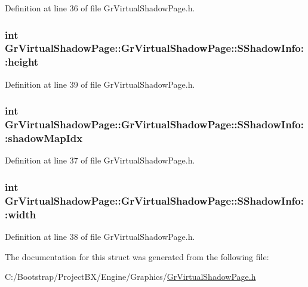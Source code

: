 Definition at line 36 of file GrVirtualShadowPage.h.\hypertarget{struct_gr_virtual_shadow_page_1_1_s_shadow_info_9558ecd2760590cd97d3133ae338f59d}{
\subsubsection[{height}]{\setlength{\rightskip}{0pt plus 5cm}int {\bf GrVirtualShadowPage::GrVirtualShadowPage::SShadowInfo::height}}}
\label{struct_gr_virtual_shadow_page_1_1_s_shadow_info_9558ecd2760590cd97d3133ae338f59d}




Definition at line 39 of file GrVirtualShadowPage.h.\hypertarget{struct_gr_virtual_shadow_page_1_1_s_shadow_info_7f7e9d5b244e39ccc703ccd4d93c9529}{
\subsubsection[{shadowMapIdx}]{\setlength{\rightskip}{0pt plus 5cm}int GrVirtualShadowPage::GrVirtualShadowPage::SShadowInfo::shadowMapIdx}}
\label{struct_gr_virtual_shadow_page_1_1_s_shadow_info_7f7e9d5b244e39ccc703ccd4d93c9529}




Definition at line 37 of file GrVirtualShadowPage.h.\hypertarget{struct_gr_virtual_shadow_page_1_1_s_shadow_info_8c1baf33631ec0aa71acb781cfbe2459}{
\subsubsection[{width}]{\setlength{\rightskip}{0pt plus 5cm}int {\bf GrVirtualShadowPage::GrVirtualShadowPage::SShadowInfo::width}}}
\label{struct_gr_virtual_shadow_page_1_1_s_shadow_info_8c1baf33631ec0aa71acb781cfbe2459}




Definition at line 38 of file GrVirtualShadowPage.h.

The documentation for this struct was generated from the following file:\begin{CompactItemize}
\item 
C:/Bootstrap/ProjectBX/Engine/Graphics/\hyperlink{_gr_virtual_shadow_page_8h}{GrVirtualShadowPage.h}\end{CompactItemize}
